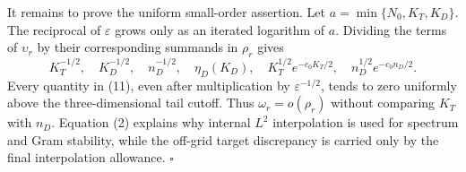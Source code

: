 It remains to prove the uniform small-order assertion. Let \(a=\min\{N_0,K_T,K_D\}\). The reciprocal of \(\varepsilon\) grows only as an iterated logarithm of \(a\). Dividing the terms of \(\upsilon_r\) by their corresponding summands in \(\rho_r\) gives
\[
 K_T^{-1/2},\quad K_D^{-1/2},\quad n_D^{-1/2},\quad
 \eta_D(K_D),\quad
 K_T^{1/2}e^{-c_0K_T/2},\quad n_D^{1/2}e^{-c_0n_D/2}.       \tag{11}
\]
Every quantity in (11), even after multiplication by \(\varepsilon^{-1/2}\), tends to zero uniformly above the three-dimensional tail cutoff. Thus \(\omega_r=o(\rho_r)\) without comparing \(K_T\) with \(n_D\). Equation (2) explains why internal \(L^2\) interpolation is used for spectrum and Gram stability, while the off-grid target discrepancy is carried only by the final interpolation allowance. \(\square\)